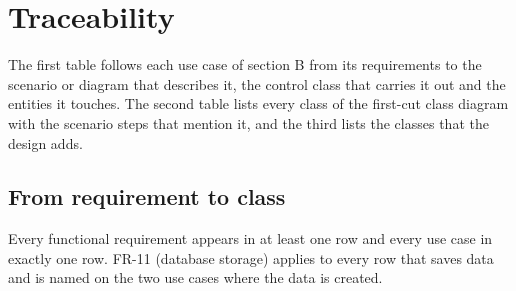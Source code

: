 \section*{Traceability}

The first table follows each use case of section B from its requirements to the
scenario or diagram that describes it, the control class that carries it out
and the entities it touches. The second table lists every class of the first-cut
class diagram with the scenario steps that mention it, and the third lists the
classes that the design adds.

\subsection*{From requirement to class}

Every functional requirement appears in at least one row and every use case in
exactly one row. FR-11 (database storage) applies to every row that saves data
and is named on the two use cases where the data is created.

